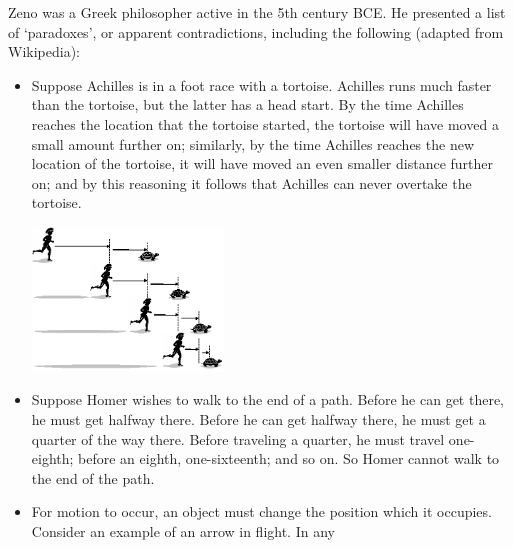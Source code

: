 \begin{questions}
  \clearpage
  \questioS Zeno was a Greek philosopher active in the 5th century BCE. He presented a list of `paradoxes', or apparent contradictions,
            including the following (adapted from Wikipedia):
            \begin{itemize}
              \item Suppose Achilles is in a foot race with a tortoise. Achilles runs much faster than the tortoise, but the latter
                    has a head start. By the time Achilles reaches the location that the tortoise started, the tortoise will have moved
                    a small amount further on; similarly, by the time Achilles reaches the new location of the tortoise, it will have moved
                    an even smaller distance further on; and by this reasoning it follows that Achilles can never overtake the tortoise.
                    \begin{center}
                      \includegraphics[width=0.4\textwidth]{achilles}
                    \end{center}
              \item Suppose Homer wishes to walk to the end of a path. Before he can get there, he must get halfway there. Before he can
                    get halfway there, he must get a quarter of the way there. Before traveling a quarter, he must travel one-eighth; before
                    an eighth, one-sixteenth; and so on. So Homer cannot walk to the end of the path.
              \item For motion to occur, an object must change the position which it occupies. Consider an example of an arrow in flight. In any

\end{itemize}
\end{questions}
